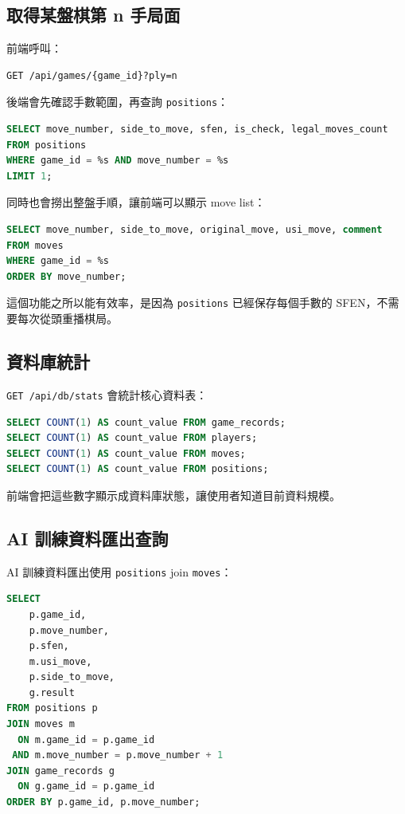 \documentclass[12pt,a4paper,fontset=none]{ctexart}
\begin{document}
\subsection{取得某盤棋第 n 手局面}

前端呼叫：

\begin{lstlisting}[style=sqlstyle]
GET /api/games/{game_id}?ply=n
\end{lstlisting}

後端會先確認手數範圍，再查詢 \texttt{positions}：

\begin{lstlisting}[style=sqlstyle,language=SQL]
SELECT move_number, side_to_move, sfen, is_check, legal_moves_count
FROM positions
WHERE game_id = %s AND move_number = %s
LIMIT 1;
\end{lstlisting}

同時也會撈出整盤手順，讓前端可以顯示 move list：

\begin{lstlisting}[style=sqlstyle,language=SQL]
SELECT move_number, side_to_move, original_move, usi_move, comment
FROM moves
WHERE game_id = %s
ORDER BY move_number;
\end{lstlisting}

這個功能之所以能有效率，是因為 \texttt{positions} 已經保存每個手數的 SFEN，不需要每次從頭重播棋局。

\subsection{資料庫統計}

\texttt{GET /api/db/stats} 會統計核心資料表：

\begin{lstlisting}[style=sqlstyle,language=SQL]
SELECT COUNT(1) AS count_value FROM game_records;
SELECT COUNT(1) AS count_value FROM players;
SELECT COUNT(1) AS count_value FROM moves;
SELECT COUNT(1) AS count_value FROM positions;
\end{lstlisting}

前端會把這些數字顯示成資料庫狀態，讓使用者知道目前資料規模。

\subsection{AI 訓練資料匯出查詢}

AI 訓練資料匯出使用 \texttt{positions} join \texttt{moves}：

\begin{lstlisting}[style=sqlstyle,language=SQL]
SELECT
    p.game_id,
    p.move_number,
    p.sfen,
    m.usi_move,
    p.side_to_move,
    g.result
FROM positions p
JOIN moves m
  ON m.game_id = p.game_id
 AND m.move_number = p.move_number + 1
JOIN game_records g
  ON g.game_id = p.game_id
ORDER BY p.game_id, p.move_number;
\end{lstlisting}
\end{document}
